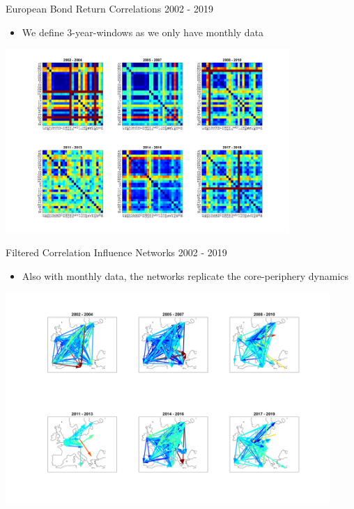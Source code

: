 \documentclass{beamer}
\begin{document}
\begin{frame}{European Bond Return Correlations 2002 - 2019}
\begin{itemize}
\item We define 3-year-windows as we only have monthly data
\end{itemize}

\includegraphics[height=7cm]{heatmaps-monthly}

\end{frame}


\begin{frame}{Filtered Correlation Influence Networks 2002 - 2019}
\begin{itemize}
\item Also with monthly data, the networks replicate the core-periphery dynamics
\end{itemize}
\vspace{0cm}\hspace*{-1cm}\includegraphics[height=8cm]{networks-monthly}
\end{frame}
\end{document}
